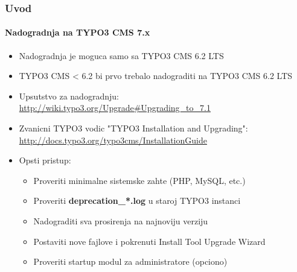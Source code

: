 \begin{frame}[fragile]
	\frametitle{Uvod}
	\framesubtitle{Nadogradnja na TYPO3 CMS 7.x}

	\begin{itemize}
		\item Nadogradnja je moguca samo sa TYPO3 CMS 6.2 LTS
		\item TYPO3 CMS < 6.2 bi prvo trebalo nadograditi na TYPO3 CMS 6.2 LTS
	\end{itemize}

	\begin{itemize}

		\item Upsutstvo za nadogradnju:\newline
			\smaller\url{http://wiki.typo3.org/Upgrade#Upgrading_to_7.1}\normalsize
		\item Zvanicni TYPO3 vodic "TYPO3 Installation and Upgrading":
			\smaller\url{http://docs.typo3.org/typo3cms/InstallationGuide}\normalsize
		\item Opsti pristup:
			\begin{itemize}
				\item Proveriti minimalne sistemske zahte \small(PHP, MySQL, etc.)
				\item Proveriti \textbf{deprecation\_*.log} u staroj TYPO3 instanci
				\item Nadograditi sva prosirenja na najnoviju verziju
				\item Postaviti nove fajlove i pokrenuti Install Tool \textrightarrow Upgrade Wizard
				\item Proveriti startup modul za administratore (opciono)
			\end{itemize}
	\end{itemize}

\end{frame}

